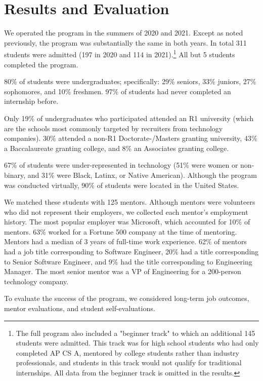 

\section{Results and Evaluation}

We operated the program in the summers of 2020 and 2021. Except as noted previously, the program was substantially the same in both years. In total 311 students were admitted (197 in 2020 and 114 in 2021).\footnote{The full program also included a "beginner track" to which an additional 145 students were admitted. This track was for high school students who had only completed AP CS A, mentored by college students rather than industry professionals, and students in this track would not qualify for traditional internships. All data from the beginner track is omitted in the results.} All but 5 students completed the program.

80\% of students were undergraduates; specifically: 29\% seniors, 33\% juniors, 27\% sophomores, and 10\% freshmen. 97\% of students had never completed an internship before.

Only 19\% of undergraduates who participated attended an R1 university (which are the schools most commonly targeted by recruiters from technology companies). 30\% attended a non-R1 Doctorate-/Masters granting university, 43\% a Baccalaureate granting college, and 8\% an Associates granting college.

67\% of students were under-represented in technology (51\% were women or non-binary, and 31\% were Black, Latinx, or Native American). Although the program was conducted virtually, 90\% of students were located in the United States.

We matched these students with 125 mentors. Although mentors were volunteers who did not represent their employers, we collected each mentor's employment history. The most popular employer was Microsoft, which accounted for 10\% of mentors. 63\% worked for a Fortune 500 company at the time of mentoring. Mentors had a median of 3 years of full-time work experience. 62\% of mentors had a job title corresponding to Software Engineer, 20\% had a title corresponding to Senior Software Engineer, and 9\% had the title corresponding to Engineering Manager. The most senior mentor was a VP of Engineering for a 200-person technology company.

To evaluate the success of the program, we considered long-term job outcomes, mentor evaluations, and student self-evaluations.


